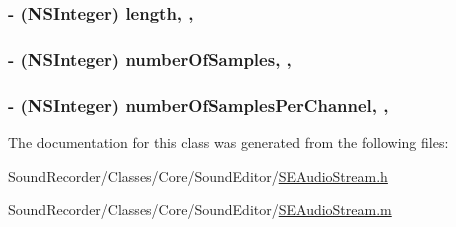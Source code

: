 \hypertarget{interface_s_e_audio_stream_a54229ab240455736790dad362c5335e1}{
\subsubsection[{length}]{\setlength{\rightskip}{0pt plus 5cm}-\/ (N\-S\-Integer) length\hspace{0.3cm}{\ttfamily [read]}, {\ttfamily [nonatomic]}, {\ttfamily [assign]}}}\label{interface_s_e_audio_stream_a54229ab240455736790dad362c5335e1}
\hypertarget{interface_s_e_audio_stream_a1e8d0ba4849fffe376bcf5494987c9a8}{
\subsubsection[{number\-Of\-Samples}]{\setlength{\rightskip}{0pt plus 5cm}-\/ (N\-S\-Integer) number\-Of\-Samples\hspace{0.3cm}{\ttfamily [read]}, {\ttfamily [nonatomic]}, {\ttfamily [assign]}}}\label{interface_s_e_audio_stream_a1e8d0ba4849fffe376bcf5494987c9a8}
\hypertarget{interface_s_e_audio_stream_afac964b9badc8642c250a2234eb3c044}{
\subsubsection[{number\-Of\-Samples\-Per\-Channel}]{\setlength{\rightskip}{0pt plus 5cm}-\/ (N\-S\-Integer) number\-Of\-Samples\-Per\-Channel\hspace{0.3cm}{\ttfamily [read]}, {\ttfamily [nonatomic]}, {\ttfamily [assign]}}}\label{interface_s_e_audio_stream_afac964b9badc8642c250a2234eb3c044}


The documentation for this class was generated from the following files\-:\begin{DoxyCompactItemize}
\item 
Sound\-Recorder/\-Classes/\-Core/\-Sound\-Editor/\hyperlink{_s_e_audio_stream_8h}{S\-E\-Audio\-Stream.\-h}\item 
Sound\-Recorder/\-Classes/\-Core/\-Sound\-Editor/\hyperlink{_s_e_audio_stream_8m}{S\-E\-Audio\-Stream.\-m}\end{DoxyCompactItemize}
